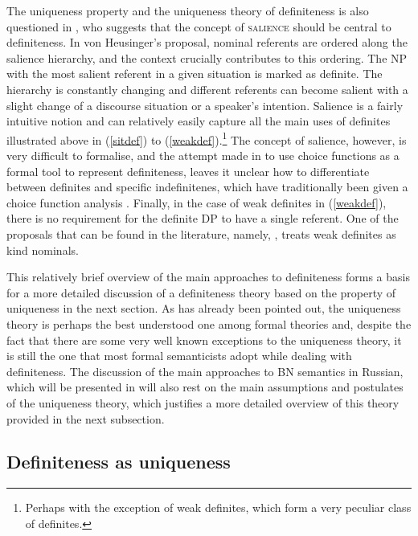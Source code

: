 \documentclass[output=paper,colorlinks,citecolor=brown]{langscibook}
\begin{document}
The uniqueness property and the uniqueness theory of definiteness is also questioned in \citet{heusinger97, vonHeusinger2002, heusinger13}, who suggests that the concept of \textsc{salience} should be central to definiteness. In von Heusinger's proposal, nominal referents are ordered along the salience hierarchy, and the context crucially contributes to this ordering. The NP with the most salient referent in a given situation is marked as definite. The hierarchy is constantly changing and different referents can become salient with a slight change of a discourse situation or a speaker's intention. Salience is a fairly intuitive notion and can relatively easily capture all the main uses of definites illustrated above in (\ref{sitdef}) to (\ref{weakdef}).\footnote{Perhaps with the exception of weak definites, which form a very peculiar class of definites.} The concept of salience, however, is very difficult to formalise, and the attempt made in \citet{heusinger13} to use choice functions as a formal tool to represent definiteness, leaves it unclear how to differentiate between definites and specific indefinitenes, which have traditionally been given a choice function analysis \citep[see][]{Reinhart1997, Winter1997}.                                                          
Finally, in the case of weak definites in (\ref{weakdef}), there is no requirement for the definite DP to have a single referent. One of the proposals that can be found in the literature, namely, \citet{aguilarzwarts14}, treats weak definites as kind nominals.

This relatively brief overview of the main approaches to definiteness forms a basis for a more detailed discussion of a definiteness theory based on the property of uniqueness in the next section. As has already been pointed out, the uniqueness theory is perhaps the best understood one among formal theories and, despite the fact that there are some very well known exceptions to the uniqueness theory, it is still the one that most formal semanticists adopt while dealing with definiteness. The discussion of the main approaches to BN semantics in Russian, which will be presented in  will also rest on the main assumptions and postulates of the uniqueness theory, which justifies a more detailed overview of this theory provided in the next subsection. 

\subsection{Definiteness as uniqueness} \label{uniqueness}
\end{document}
